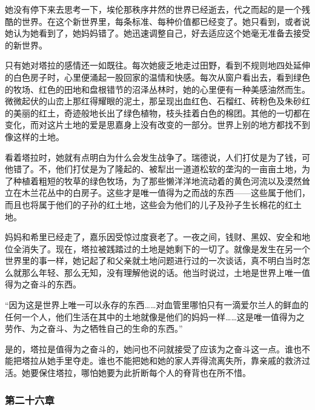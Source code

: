 \par 她没有停下来去思考一下，埃伦那秩序井然的世界已经逝去，代之而起的是一个残酷的世界。在这个新世界里，每条标准、每种价值都已经变了。她只看到，或者说她认为她看到了，她妈妈错了。她迅速调整自己，好去适应这个她毫无准备去接受的新世界。
\par 只有她对塔拉的感情还一如既往。每次她疲乏地走过田野，看到不规则地四处延伸的白色房子时，心里便涌起一股回家的温情和快感。每次从窗户看出去，看到绿色的牧场、红色的田地和盘根错节的沼泽丛林时，她的心里便有一种美感油然而生。微微起伏的山峦上那红得耀眼的泥土，那呈现出血红色、石榴红、砖粉色及朱砂红的美丽的红土，奇迹般地长出了绿色植物，枝头挂着白色的棉团。其他的一切都在变化，而对这片土地的爱是思嘉身上没有改变的一部分。世界上别的地方都找不到像这样的土地。
\par 看着塔拉时，她就有点明白为什么会发生战争了。瑞德说，人们打仗是为了钱，可他错了。不，他们打仗是为了隆起的、被犁出一道道松软的垄沟的一亩亩土地，为了种植着粗短的牧草的绿色牧场，为了那些懒洋洋地流动着的黄色河流以及漠然耸立在木兰花丛中的白房子。这些才是唯一值得为之而战的东西——这些属于他们，而且也将属于他们的子孙的红土地，这些会为他们的儿子及孙子生长棉花的红土地。
\par 妈妈和希里已经走了，嘉乐因受惊过度衰老了。一夜之间，钱财、黑奴、安全和地位全消失了。现在，塔拉被践踏过的土地是她剩下的一切了。就像是发生在另一个世界里的事一样，她记起了和父亲就土地问题进行过的一次谈话，真不明白当时怎么就那么年轻、那么无知，没有理解他说的话。他当时说过，土地是世界上唯一值得为之奋斗的东西。
\par “因为这是世界上唯一可以永存的东西……对血管里哪怕只有一滴爱尔兰人的鲜血的任何一个人，他们生活在其中的土地就像是他们的妈妈一样……这是唯一值得为之劳作、为之奋斗、为之牺牲自己的生命的东西。”
\par 是的，塔拉是值得为之奋斗的，她问也不问就接受了应该为之奋斗这一点。谁也不能把塔拉从她手里夺走。谁也不能把她和她的家人弄得流离失所，靠亲戚的救济过活。她要保住塔拉，哪怕她要为此折断每个人的脊背也在所不惜。

\subsubsection{第二十六章}

